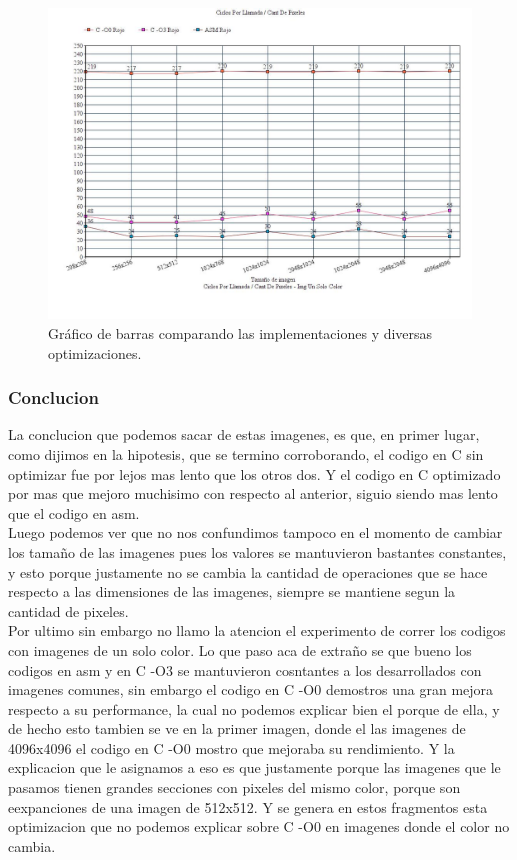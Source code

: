 \medskip\begin{figure}[h!]
\centering
\captionsetup{justification=centering}
	\includegraphics[width = 15 cm, height = 8 cm]{imagenes/mismoColor.jpg}
	\caption[center]{Gráfico de barras comparando las implementaciones y diversas optimizaciones.}
\end{figure}

\medskip

\subsubsection{Conclucion}
La conclucion que podemos sacar de estas imagenes, es que, en primer lugar, como dijimos en la hipotesis, que se termino corroborando, el codigo en C sin optimizar fue por lejos mas lento que los otros dos. Y el codigo en C optimizado por mas que mejoro muchisimo con respecto al anterior, siguio siendo mas lento que el codigo en asm. \\ Luego podemos ver que no nos confundimos tampoco en el momento de cambiar los tamaño de las imagenes pues los valores se mantuvieron bastantes constantes, y esto porque justamente no se cambia la cantidad de operaciones que se hace respecto a las dimensiones de las imagenes, siempre se mantiene segun la cantidad de pixeles. \\ Por ultimo sin embargo no llamo la atencion el experimento de correr los codigos con imagenes de un solo color. Lo que paso aca de extraño se que bueno los codigos en asm y en C -O3 se mantuvieron cosntantes a los desarrollados con imagenes comunes, sin embargo el codigo en C -O0 demostros una gran mejora respecto a su performance, la cual no podemos explicar bien el porque de ella, y de hecho esto tambien se ve en la primer imagen, donde el las imagenes de 4096x4096 el codigo en C -O0 mostro que mejoraba su rendimiento. Y la explicacion que le asignamos a eso es que justamente porque las imagenes que le pasamos tienen grandes secciones con pixeles del mismo color, porque son eexpanciones de una imagen de 512x512. Y se genera en estos fragmentos esta optimizacion que no podemos explicar sobre C -O0 en imagenes donde el color no cambia.

